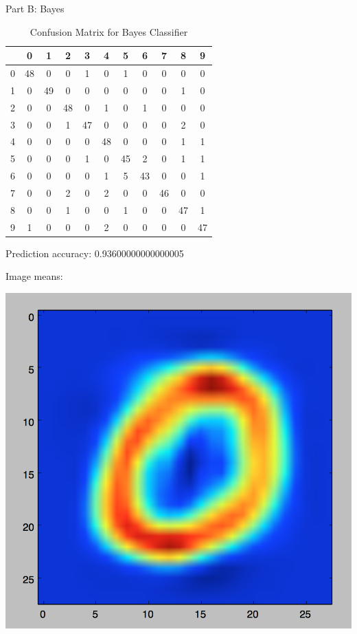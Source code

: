 \documentclass[11pt]{article}
\begin{document}
Part B: Bayes

\begin{table}[!th]
\centering
\begin{tabular}{|c|cccccccccc|}
\hline
 & 0 & 1 & 2 & 3 & 4 & 5 & 6 & 7 & 8 & 9 \\
\hline
0 & 48 & 0 & 0 & 1 & 0 & 1 & 0 & 0 & 0 & 0 \\
1 & 0 & 49 & 0 & 0 & 0 & 0 & 0 & 0 & 1 & 0 \\
2 & 0 & 0 & 48 & 0 & 1 & 0 & 1 & 0 & 0 & 0 \\
3 & 0 & 0 & 1 & 47 & 0 & 0 & 0 & 0 & 2 & 0 \\
4 & 0 & 0 & 0 & 0 & 48 & 0 & 0 & 0 & 1 & 1 \\ 
5 & 0 & 0 & 0 & 1 & 0 & 45 & 2 & 0 & 1 & 1 \\
6 & 0 & 0 & 0 & 0 & 1 & 5 & 43 & 0 & 0 & 1 \\ 
7 & 0 & 0 & 2 & 0 & 2 & 0 & 0 & 46 & 0 & 0 \\
8 & 0 & 0 & 1 & 0 & 0 & 1 & 0 & 0 & 47 & 1 \\
9 & 1 & 0 & 0 & 0 & 2 & 0 & 0 & 0 & 0 & 47 \\
\hline
\end{tabular}
\caption{Confusion Matrix for Bayes Classifier}
\label{ex:table}
\end{table}

Prediction accuracy: 0.93600000000000005

Image means:

\includegraphics[scale=.3]{images/bayes0.png}
\end{document}
